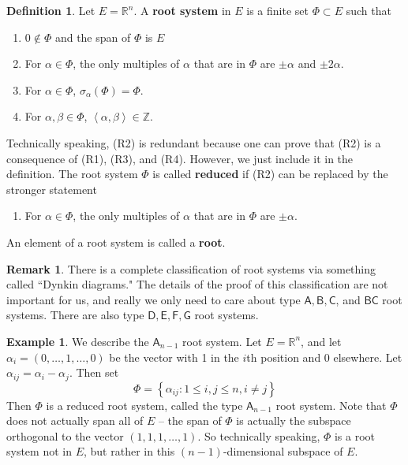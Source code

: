 \documentclass[12pt]{article}
\theoremstyle{definition}
\newtheorem{definition}[theorem]{Definition}
\newtheorem{example}[theorem]{Example}
\newtheorem{remark}[theorem]{Remark}
\newcommand{\Z}{\mathbb{Z}}
\newcommand{\R}{\mathbb{R}}
\newcommand{\sig}{\sigma}
\newcommand{\lb}{\left\{}
\newcommand{\rb}{\right\}}
\newcommand{\la}{\left\langle}
\newcommand{\ra}{\right\rangle}
\newcommand{\tbf}{\textbf}
\begin{document}
\begin{definition}
Let $E = \R^n$. A \tbf{root system} in $E$ is a finite set $\Phi \subset E$ such that
\begin{enumerate}[(R1)]
	\item $0 \not \in \Phi$ and the span of $\Phi$ is $E$
	\item For $\alpha \in \Phi$, the only multiples of $\alpha$ that are in $\Phi$ are $\pm \alpha$ and $\pm 2 \alpha$.
	\item For $\alpha \in \Phi$, $\sig_\alpha(\Phi) = \Phi$.
	\item For $\alpha, \beta \in \Phi$, $\la \alpha, \beta \ra \in \Z$.
\end{enumerate}
Technically speaking, (R2) is redundant because one can prove that (R2) is a consequence of (R1), (R3), and (R4). However, we just include it in the definition. The root system $\Phi$ is called \tbf{reduced} if (R2) can be replaced by the stronger statement
\begin{enumerate}
	\item[(R2')] For $\alpha \in \Phi$, the only multiples of $\alpha$ that are in $\Phi$ are $\pm \alpha$.
\end{enumerate}
An element of a root system is called a \tbf{root}.
\end{definition}

\begin{remark}
There is a complete classification of root systems via something called ``Dynkin diagrams." The details of the proof of this classification are not important for us, and really we only need to care about type $\mathsf{A}, \mathsf{B}, \mathsf{C}$, and $\mathsf{BC}$ root systems. There are also type $\mathsf{D}, \mathsf{E}, \mathsf{F}, \mathsf{G}$ root systems.
\end{remark}

\begin{example}
We describe the $\mathsf{A}_{n-1}$ root system. Let $E = \R^n$, and let $\alpha_i = (0, \ldots, 1, \ldots, 0)$ be the vector with 1 in the $i$th position and 0 elsewhere. Let $\alpha_{ij} = \alpha_i - \alpha_j$. Then set
\[
	\Phi = \lb \alpha_{ij} : 1 \le i,j \le n, i \neq j \rb
\]
Then $\Phi$ is a reduced root system, called the type $\mathsf{A}_{n-1}$ root system. Note that $\Phi$ does not actually span all of $E$ -- the span of $\Phi$ is actually the subspace orthogonal to the vector $(1, 1, 1, \ldots, 1)$. So technically speaking, $\Phi$ is a root system not in $E$, but rather in this $(n-1)$-dimensional subspace of $E$. 
\end{example}
\end{document}
